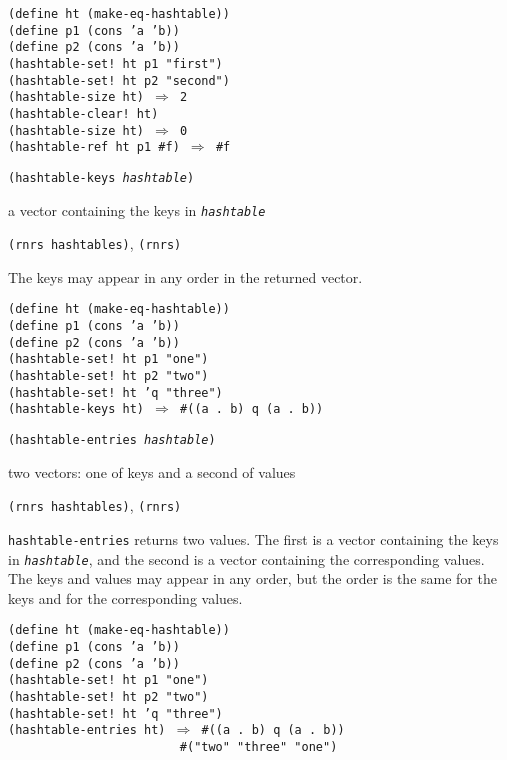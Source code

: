 \begin{alltt}
(define ht (make-eq-hashtable))
(define p1 (cons 'a 'b))
(define p2 (cons 'a 'b))
(hashtable-set! ht p1 "first")
(hashtable-set! ht p2 "second")
(hashtable-size ht) \(\Rightarrow\) 2
(hashtable-clear! ht)
(hashtable-size ht) \(\Rightarrow\) 0
(hashtable-ref ht p1 \#{}f) \(\Rightarrow\) \#{}f
\end{alltt}

\begin{description}

\label{objects_s288}\item[procedure] \texttt{(hashtable-keys \textit{hashtable})}



\item[returns] a vector containing the keys in \texttt{\textit{hashtable}}


\item[libraries] \texttt{(rnrs hashtables)}, \texttt{(rnrs)}
\end{description}


The keys may appear in any order in the returned vector.


\begin{alltt}
(define ht (make-eq-hashtable))
(define p1 (cons 'a 'b))
(define p2 (cons 'a 'b))
(hashtable-set! ht p1 "one")
(hashtable-set! ht p2 "two")
(hashtable-set! ht 'q "three")
(hashtable-keys ht) \(\Rightarrow\) \#{}((a . b) q (a . b))
\end{alltt}

\begin{description}

\label{objects_s289}\item[procedure] \texttt{(hashtable-entries \textit{hashtable})}



\item[returns] two vectors: one of keys and a second of values


\item[libraries] \texttt{(rnrs hashtables)}, \texttt{(rnrs)}
\end{description}

\texttt{hashtable-entries} returns two values.
The first is a vector containing the keys in \texttt{\textit{hashtable}}, and the second
is a vector containing the corresponding values.
The keys and values may appear in any order, but the order is the same
for the keys and for the corresponding values.

\begin{alltt}
(define ht (make-eq-hashtable))
(define p1 (cons 'a 'b))
(define p2 (cons 'a 'b))
(hashtable-set! ht p1 "one")
(hashtable-set! ht p2 "two")
(hashtable-set! ht 'q "three")
(hashtable-entries ht) \(\Rightarrow\) \#{}((a . b) q (a . b))
                        \#{}("two" "three" "one")
\end{alltt}

